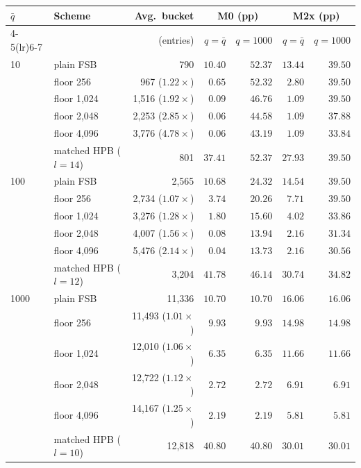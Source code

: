 \begin{tabular}{llrrrrr}
\toprule
$\bar q$ & Scheme & Avg.\ bucket & \multicolumn{2}{c}{M0 (pp)} & \multicolumn{2}{c}{M2x (pp)} \\
\cmidrule(lr){4-5}\cmidrule(lr){6-7}
 & & (entries) & $q=\bar q$ & $q=1000$ & $q=\bar q$ & $q=1000$ \\
\midrule
10 & plain FSB & 790 & $10.40$ & $52.37$ & $13.44$ & $39.50$ \\
 & floor 256 & 967 ($1.22\times$) & $0.65$ & $52.32$ & $2.80$ & $39.50$ \\
 & floor 1,024 & 1,516 ($1.92\times$) & $0.09$ & $46.76$ & $1.09$ & $39.50$ \\
 & floor 2,048 & 2,253 ($2.85\times$) & $0.06$ & $44.58$ & $1.09$ & $37.88$ \\
 & floor 4,096 & 3,776 ($4.78\times$) & $0.06$ & $43.19$ & $1.09$ & $33.84$ \\
 & matched HPB ($l=14$) & 801 & $37.41$ & $52.37$ & $27.93$ & $39.50$ \\
\midrule
100 & plain FSB & 2,565 & $10.68$ & $24.32$ & $14.54$ & $39.50$ \\
 & floor 256 & 2,734 ($1.07\times$) & $3.74$ & $20.26$ & $7.71$ & $39.50$ \\
 & floor 1,024 & 3,276 ($1.28\times$) & $1.80$ & $15.60$ & $4.02$ & $33.86$ \\
 & floor 2,048 & 4,007 ($1.56\times$) & $0.08$ & $13.94$ & $2.16$ & $31.34$ \\
 & floor 4,096 & 5,476 ($2.14\times$) & $0.04$ & $13.73$ & $2.16$ & $30.56$ \\
 & matched HPB ($l=12$) & 3,204 & $41.78$ & $46.14$ & $30.74$ & $34.82$ \\
\midrule
1000 & plain FSB & 11,336 & $10.70$ & $10.70$ & $16.06$ & $16.06$ \\
 & floor 256 & 11,493 ($1.01\times$) & $9.93$ & $9.93$ & $14.98$ & $14.98$ \\
 & floor 1,024 & 12,010 ($1.06\times$) & $6.35$ & $6.35$ & $11.66$ & $11.66$ \\
 & floor 2,048 & 12,722 ($1.12\times$) & $2.72$ & $2.72$ & $6.91$ & $6.91$ \\
 & floor 4,096 & 14,167 ($1.25\times$) & $2.19$ & $2.19$ & $5.81$ & $5.81$ \\
 & matched HPB ($l=10$) & 12,818 & $40.80$ & $40.80$ & $30.01$ & $30.01$ \\
\bottomrule
\end{tabular}
